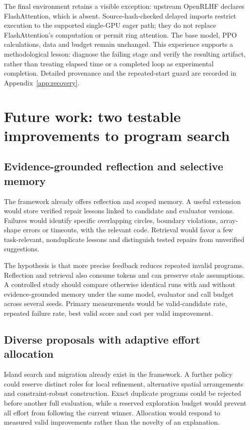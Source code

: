 The final environment retains a visible exception: upstream OpenRLHF declares FlashAttention, which is absent. Source-hash-checked delayed imports restrict execution to the supported single-GPU eager path; they do not replace FlashAttention's computation or permit ring attention. The base model, PPO calculations, data and budget remain unchanged. This experience supports a methodological lesson: diagnose the failing stage and verify the resulting artifact, rather than treating elapsed time or a completed loop as experimental completion. Detailed provenance and the repeated-start guard are recorded in Appendix~\ref{app:recovery}.

\section{Future work: two testable improvements to program search}\label{sec:future}
\subsection{Evidence-grounded reflection and selective memory}
The framework already offers reflection and scoped memory.\cite{memory} A useful extension would store verified repair lessons linked to candidate and evaluator versions. Failures would identify specific overlapping circles, boundary violations, array-shape errors or timeouts, with the relevant code. Retrieval would favor a few task-relevant, nonduplicate lessons and distinguish tested repairs from unverified suggestions.

The hypothesis is that more precise feedback reduces repeated invalid programs. Reflection and retrieval also consume tokens and can preserve stale assumptions. A controlled study should compare otherwise identical runs with and without evidence-grounded memory under the same model, evaluator and call budget across several seeds. Primary measurements would be valid-candidate rate, repeated failure rate, best valid score and cost per valid improvement.

\subsection{Diverse proposals with adaptive effort allocation}
Island search and migration already exist in the framework.\cite{islands} A further policy could reserve distinct roles for local refinement, alternative spatial arrangements and constraint-robust construction. Exact duplicate programs could be rejected before another full evaluation, while a reserved exploration budget would prevent all effort from following the current winner. Allocation would respond to measured valid improvements rather than the novelty of an explanation.

